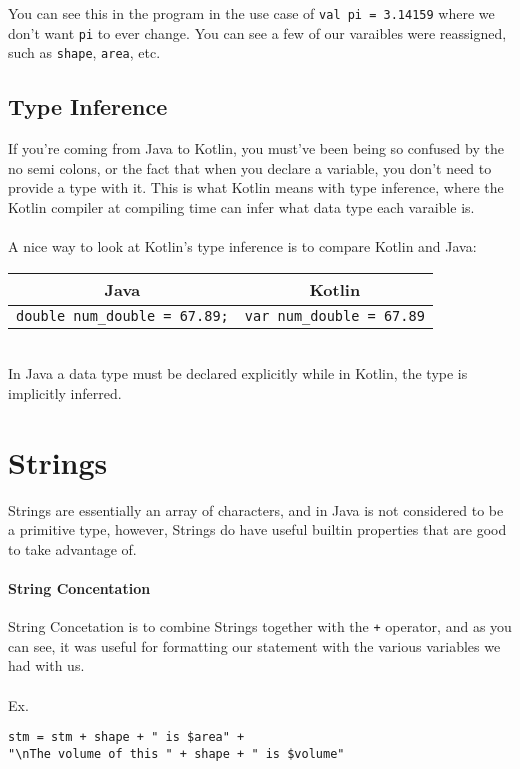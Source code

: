 \par You can see this in the program in the use case of \verb!val pi = 3.14159! where we don't want \verb!pi! to ever change. You 
can see a few of our varaibles were reassigned, such as \verb!shape!, \verb!area!, etc.  

\subsection{Type Inference}
If you're coming from Java to Kotlin, you must've been being so confused by the no semi colons, or the fact that when you declare a
variable, you don't need to provide a type with it. This is what Kotlin means with type inference, where the Kotlin compiler at 
compiling time can infer what data type each varaible is.  
\\\\
A nice way to look at Kotlin's type inference is to compare Kotlin and Java: 
\\
\begin{tabular}{|c|c|}
    \hline
    Java & Kotlin \\
    \hline
    \verb!double num_double = 67.89;! & \verb!var num_double = 67.89! \\
    \hline
\end{tabular}
\\
In Java a data type must be declared explicitly while in Kotlin, the type is implicitly inferred. 

\section{Strings}
Strings are essentially an array of characters, and in Java is not considered to be a primitive type, 
however, Strings do have useful builtin properties that are good to take advantage of. 

\paragraph{String Concentation}
String Concetation is to combine Strings together with the \verb!+! operator, and as you can see, 
it was useful for formatting our statement with the various variables we had with us. 
\\\\
Ex. 
\begin{verbatim}
stm = stm + shape + " is $area" + 
"\nThe volume of this " + shape + " is $volume"
\end{verbatim}

